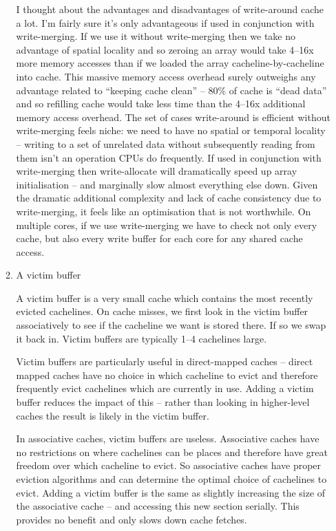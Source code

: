 \documentclass[10pt,\jkfside,a4paper]{article}
\begin{document}
\begin{enumerate}
\begin{enumerate}[label=(\alph*)]
I thought about the advantages and disadvantages of write-around cache a lot.
I'm fairly sure it's only advantageous if used in conjunction with
write-merging. If we use it without write-merging then we take no advantage
of spatial locality and so zeroing an array would take 4--16x more memory
accesses than if we loaded the array cacheline-by-cacheline into cache.
This massive memory access overhead surely outweighs any advantage related
to ``keeping cache clean'' -- 80\% of cache is ``dead data'' and so refilling
cache would take less time than the 4--16x additional memory access overhead.
The set of cases write-around is efficient without write-merging feels
niche: we need to have no spatial or temporal locality -- writing to a set of
unrelated data without subsequently reading from them isn't an operation CPUs
do frequently. If used in conjunction with write-merging then write-allocate
will dramatically speed up array initialisation -- and marginally slow
almost everything else down. Given the dramatic additional complexity and
lack of cache consistency due to write-merging, it feels like an
optimisation that is not worthwhile. On multiple cores, if we use
write-merging we have to check not only every cache, but also every write
buffer for each core for any shared cache access.

\fi

\item A victim buffer

A victim buffer is a very small cache which contains the most recently
evicted cachelines. On cache misses, we first look in the victim buffer
associatively to see if the cacheline we want is stored there. If so we swap
it back in. Victim buffers are typically 1--4 cachelines large.

Victim buffers are particularly useful in direct-mapped caches -- direct
mapped caches have no choice in which cacheline to evict and therefore
frequently evict cachelines which are currently in use. Adding a victim
buffer reduces the impact of this -- rather than looking in higher-level
caches the result is likely in the victim buffer.

In associative caches, victim buffers are useless. Associative caches have
no restrictions on where cachelines can be places and therefore have great
freedom over which cacheline to evict. So associative caches have proper
eviction algorithms and can determine the optimal choice of cachelines
to evict. Adding a victim buffer is the same as slightly increasing the size
of the associative cache -- and accessing this new section serially. This
provides no benefit and only slows down cache fetches.


\end{enumerate}
\end{enumerate}
\end{document}
